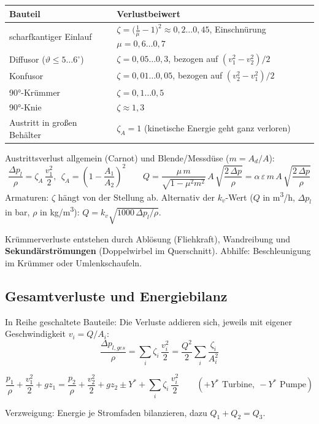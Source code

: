 \documentclass[11pt,a4paper]{article}
\begin{document}
\begin{center}
\small
\renewcommand{\arraystretch}{1.35}
\begin{tabular}{@{}ll@{}}
\toprule
Bauteil & Verlustbeiwert \\ \midrule
scharfkantiger Einlauf & $\zeta = \bigl(\frac{1}{\mu} - 1\bigr)^2 \approx 0{,}2\ldots0{,}45$, Einschnürung $\mu = 0{,}6\ldots0{,}7$ \\
Diffusor ($\vartheta \le 5\ldots6^\circ$) & $\zeta = 0{,}05\ldots0{,}3$, bezogen auf $(v_1^2 - v_2^2)/2$ \\
Konfusor & $\zeta = 0{,}01\ldots0{,}05$, bezogen auf $(v_2^2 - v_1^2)/2$ \\
90°-Krümmer & $\zeta = 0{,}1\ldots0{,}5$ \\
90°-Knie & $\zeta \approx 1{,}3$ \\
Austritt in großen Behälter & $\zeta_A = 1$ (kinetische Energie geht ganz verloren) \\
\bottomrule
\end{tabular}
\end{center}

Austrittsverlust allgemein (Carnot) und Blende/Messdüse ($m = A_d/A$):
\[
\frac{\Delta p_l}{\rho} = \zeta_A\,\frac{v_1^2}{2},\ \ \zeta_A = \left(1 - \frac{A_1}{A_2}\right)^2
\qquad
Q = \frac{\mu\,m}{\sqrt{1 - \mu^2 m^2}}\,A\,\sqrt{\frac{2\,\Delta p}{\rho}} = \alpha\,\varepsilon\,m\,A\,\sqrt{\frac{2\,\Delta p}{\rho}}
\]
Armaturen: $\zeta$ hängt von der Stellung ab. Alternativ der $k_v$-Wert ($Q$ in \si{m^3/h}, $\Delta p_l$ in bar, $\rho$ in \si{kg/m^3}): $Q = k_v\sqrt{1000\,\Delta p_l/\rho}$.

Krümmerverluste entstehen durch Ablösung (Fliehkraft), Wandreibung und \textbf{Sekundärströmungen} (Doppelwirbel im Querschnitt). Abhilfe: Beschleunigung im Krümmer oder Umlenkschaufeln.

\subsection{Gesamtverluste und Energiebilanz}

In Reihe geschaltete Bauteile: Die Verluste addieren sich, jeweils mit eigener Geschwindigkeit $v_i = Q/A_i$:
\[
\frac{\Delta p_{l,ges}}{\rho} = \sum_i \zeta_i\,\frac{v_i^2}{2} = \frac{Q^2}{2}\sum_i \frac{\zeta_i}{A_i^2}
\]
\begin{formel}[title={Erweiterte Bernoulli-Gleichung -- die wichtigste Formel für Rechenaufgaben}]
\[
\frac{p_1}{\rho} + \frac{v_1^2}{2} + g z_1 = \frac{p_2}{\rho} + \frac{v_2^2}{2} + g z_2 \pm Y^* + \sum_i \zeta_i\,\frac{v_i^2}{2}
\qquad (+Y^*\text{ Turbine},\ -Y^*\text{ Pumpe})
\]
\end{formel}
Verzweigung: Energie je Stromfaden bilanzieren, dazu $Q_1 + Q_2 = Q_3$.
\end{document}
